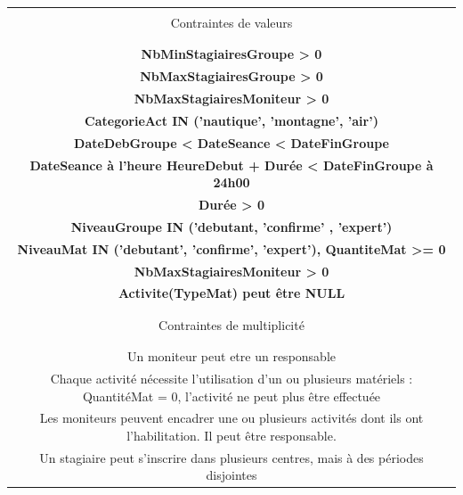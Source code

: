 \documentclass[10pt]{article}
\begin{document}
\begin{small}
\begin{tabular}{|c|}
\hline
\\Contraintes de valeurs\\ \\
\hline

\\\textbf{NbMinStagiairesGroupe > 0} \\

\textbf{NbMaxStagiairesGroupe > 0}\\

\textbf{NbMaxStagiairesMoniteur > 0}\\

\textbf{CategorieAct IN ('nautique', 'montagne', 'air')}\\

\textbf{DateDebGroupe < DateSeance < DateFinGroupe}\\

\textbf{DateSeance à l'heure HeureDebut + Durée < DateFinGroupe à 24h00}\\

\textbf{Durée > 0}\\

\textbf{NiveauGroupe IN ('debutant, 'confirme' , 'expert')}\\

\textbf{NiveauMat IN ('debutant', 'confirme', 'expert'), QuantiteMat >= 0}\\

\textbf{NbMaxStagiairesMoniteur > 0}\\

\textbf{Activite(TypeMat) peut être NULL}\\ \\

\hline
\\Contraintes de multiplicité\\ \\
\hline

\\Un moniteur peut etre un responsable\\

Chaque activité nécessite l'utilisation d'un ou plusieurs matériels : QuantitéMat = 0, l'activité ne peut plus être 
effectuée\\

Les moniteurs peuvent encadrer une ou plusieurs activités dont ils ont l'habilitation. Il peut être responsable.\\

Un stagiaire peut s'inscrire dans plusieurs centres, mais à des périodes disjointes\\


\end{tabular}
\end{small}
\end{document}
